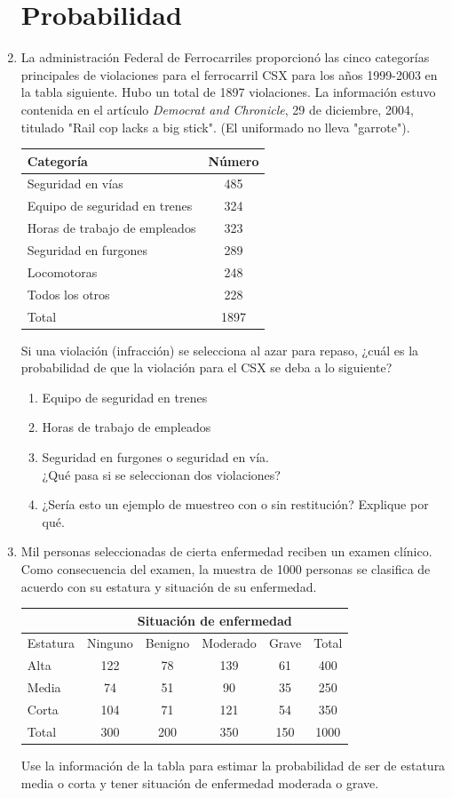 \documentclass[10pt,twoside]{article}
\begin{document}
\begin{enumerate}
\section*{Probabilidad}
\item La administración Federal de Ferrocarriles proporcionó las cinco categorías principales de violaciones para el ferrocarril CSX para los años 1999-2003 en la tabla siguiente. Hubo un total de 1897 violaciones. La información estuvo contenida en el artículo \textit{Democrat and Chronicle}, 29 de diciembre, 2004, titulado "Rail cop lacks a big stick". (El uniformado no lleva "garrote").
\begin{center}
\begin{tabular}{lc}
Categor\'{i}a & N\'{u}mero \\ 
\hline 
Seguridad en v\'{i}as & 485 \\ 
Equipo de seguridad en trenes & 324 \\ 
Horas de trabajo de empleados & 323 \\ 
Seguridad en furgones & 289 \\ 
Locomotoras & 248 \\ 
Todos los otros & 228 \\ 
\hline 
Total & 1897 \\ 
\end{tabular} 
\end{center}
Si una violación (infracción) se selecciona al azar para repaso, ¿cuál es la probabilidad de que la violación para el CSX se deba a lo siguiente?
\begin{enumerate}
\item Equipo de seguridad en trenes
\item Horas de trabajo de empleados
\item Seguridad en furgones o seguridad en vía.\\
 ¿Qué pasa si se seleccionan dos violaciones?
 \item ¿Sería esto un ejemplo de muestreo con o sin restitución? Explique por qué.
\end{enumerate}
\item Mil personas seleccionadas de cierta enfermedad reciben un examen clínico. Como consecuencia del examen, la muestra de 1000 personas se clasifica de acuerdo con su estatura y situaci\'{o}n de su enfermedad.
\begin{center}
\begin{tabular}{lccccc}
 & \multicolumn{5}{c}{Situación de enfermedad} \\ \hline 
Estatura & Ninguno & Benigno & Moderado & Grave & Total \\ \hline
Alta & 122 & 78 & 139 & 61 & 400 \\ 
Media & 74 & 51 & 90 & 35 & 250 \\ 
Corta & 104 & 71 & 121 & 54 & 350 \\ 
\hline 
Total & 300 & 200 & 350 & 150 & 1000 \\ 
\hline 
\end{tabular} 

\end{center}Use la información de la tabla para estimar la probabilidad de ser de estatura media o corta y tener situación de enfermedad moderada o grave.
\end{enumerate}
\end{document}

